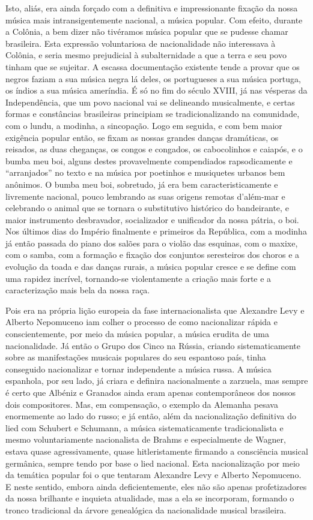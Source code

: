 Isto, aliás, era ainda forçado com a definitiva e impressionante fixação
da nossa música mais intransigentemente nacional, a música popular. Com
efeito, durante a Colônia, a bem dizer não tivéramos música popular que
se pudesse chamar brasileira. Esta expressão voluntariosa de
nacionalidade não interessava à Colônia, e seria mesmo prejudicial à
subalternidade a que a terra e seu povo tinham que se sujeitar. A
escassa documentação existente tende a provar que os negros faziam a sua
música negra lá deles, os portugueses a sua música portuga, os índios a
sua música ameríndia. É só no fim do século XVIII, já nas vésperas da
Independência, que um povo nacional vai se delineando musicalmente, e
certas formas e constâncias brasileiras principiam se tradicionalizando
na comunidade, com o lundu, a modinha, a sincopação. Logo em seguida, e
com bem maior exigência popular então, se fixam as nossas grandes danças
dramáticas, os reisados, as duas cheganças, os congos e congados, os
cabocolinhos e caiapós, e o bumba meu boi, alguns destes provavelmente
compendiados rapsodicamente e ``arranjados'' no texto e na música por
poetinhos e musiquetes urbanos bem anônimos. O bumba meu boi, sobretudo,
já era bem caracteristicamente e livremente nacional, pouco lembrando as
suas origens remotas d'além-mar e celebrando o animal que se tornara o
substitutivo histórico do bandeirante, e maior instrumento desbravador,
socializador e unificador da nossa pátria, o boi. Nos últimos dias do
Império finalmente e primeiros da República, com a modinha já então
passada do piano dos salões para o violão das esquinas, com o maxixe,
com o samba, com a formação e fixação dos conjuntos seresteiros dos
choros e a evolução da toada e das danças rurais, a música popular
cresce e se define com uma rapidez incrível, tornando-se violentamente a
criação mais forte e a caracterização mais bela da nossa raça.

Pois era na própria lição europeia da fase internacionalista que
Alexandre Levy e Alberto Nepomuceno iam colher o processo de como
nacionalizar rápida e conscientemente, por meio da música popular, a
música erudita de uma nacionalidade. Já então o Grupo dos Cinco na
Rússia, criando sistematicamente sobre as manifestações musicais
populares do seu espantoso país, tinha conseguido nacionalizar e tornar
independente a música russa. A música espanhola, por seu lado, já criara
e definira nacionalmente a zarzuela, mas sempre é certo que Albéniz e
Granados ainda eram apenas contemporâneos dos nossos dois compositores.
Mas, em compensação, o exemplo da Alemanha pesava enormemente ao lado do
russo; e já então, além da nacionalização definitiva do lied com
Schubert e Schumann, a música sistematicamente tradicionalista e mesmo
voluntariamente nacionalista de Brahms e especialmente de Wagner, estava
quase agressivamente, quase hitleristamente firmando a consciência
musical germânica, sempre tendo por base o lied nacional. Esta
nacionalização por meio da temática popular foi o que tentaram Alexandre
Levy e Alberto Nepomuceno. E neste sentido, embora ainda
deficientemente, eles não são apenas profetizadores da nossa brilhante e
inquieta atualidade, mas a ela se incorporam, formando o tronco
tradicional da árvore genealógica da nacionalidade musical brasileira.

